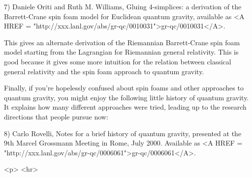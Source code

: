 7) Daniele Oriti and Ruth M. Williams, Gluing 4-simplices: a derivation
of the Barrett-Crane spin foam model for Euclidean quantum gravity,
available as <A HREF =
"http://xxx.lanl.gov/abs/gr-qc/0010031">gr-qc/0010031</A>.

This gives an alternate derivation of the Riemannian Barrett-Crane spin 
foam model starting from the Lagrangian for Riemannian general relativity.
This is good because it gives some more intuition for the relation between
classical general relativity and the spin foam approach to quantum gravity.

Finally, if you're hopelessly confused about spin foams and other
approaches to quantum gravity, you might enjoy the following little
history of quantum gravity.  It explains how many different approaches
were tried, leading up to the research directions that people pursue
now:

8) Carlo Rovelli, Notes for a brief history of quantum gravity,
presented at the 9th Marcel Grossmann Meeting in Rome, July 2000.
Available as <A HREF =
"http://xxx.lanl.gov/abs/gr-qc/0006061">gr-qc/0006061</A>.










<p> <hr>



